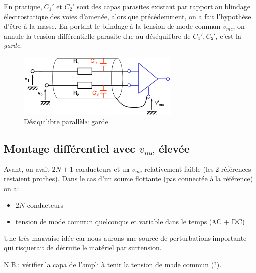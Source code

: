 En pratique, \(C_1'\text{ et }C_2'\) sont des capas parasites existant par rapport au blindage électrostatique des voies d'amenée, alors que précédemment, on a fait l'hypothèse d'être à la masse. En portant le blindage à la tension de mode commun \(v_{mc}\), on annule la tension différentielle parasite due au déséquilibre de \(C_1', C_2'\), c'est la \emph{garde}.
\begin{figure}[H] 
	\centering 
	\includegraphics[width=0.7\textwidth,height=10\baselineskip,keepaspectratio]{ch3/image20} 
	\caption{Désiquilibre parallèle: garde} 
\end{figure}
\subsection{Montage différentiel avec \texorpdfstring{\(v_{mc}\)}{tension de mode commun} élevée}
Avant, on avait \(2N+1\) conducteurs et un \(v_{mc}\) relativement faible (les 2 références restaient proches). Dans le cas d'un source flottante (pas connectée à la référence) on a:
\begin{itemize}
	\item \(2N\) conducteurs
	\item tension de mode commun quelconque et variable dans le temps (AC + DC)
\end{itemize}
Une très mauvaise idée car nous aurons une source de perturbations importante qui risquerait de détruite le matériel par surtension.

N.B.: vérifier la capa de l'ampli à tenir la tension de mode commun (?).
